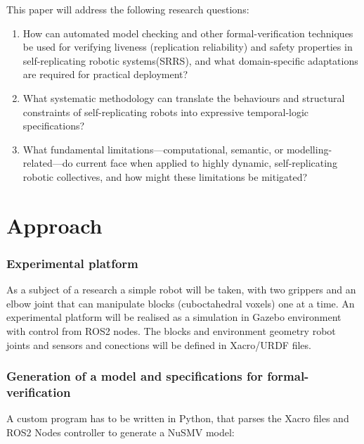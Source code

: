 
This paper will address the following research questions:
\begin{enumerate}
    \item How can automated model checking and other formal-verification techniques be used for verifying liveness (replication reliability) and safety properties 
        in self-replicating robotic systems(SRRS), and what domain-specific adaptations are required for practical deployment?
    \item What systematic methodology can translate the behaviours and structural constraints 
        of self-replicating robots into expressive temporal-logic specifications?
    \item What fundamental limitations—computational, semantic, or modelling-related—do current 
         face when applied to highly dynamic, self-replicating robotic collectives, and how might these limitations be mitigated?
\end{enumerate}

\section{Approach}

\subsubsection{Experimental platform}
As a subject of a research a simple robot will be taken, with two grippers and an elbow joint that can manipulate blocks (cuboctahedral voxels) one at a time.
An experimental platform will be realised as a simulation in Gazebo environment with control from ROS2 nodes. The  blocks and environment geometry robot joints and sensors and conections 
will be defined in Xacro/URDF files. 


\subsubsection{Generation of a model and specifications for formal-verification}
A custom program has to be written in Python, that parses the Xacro files and ROS2 Nodes controller to generate a NuSMV model:

